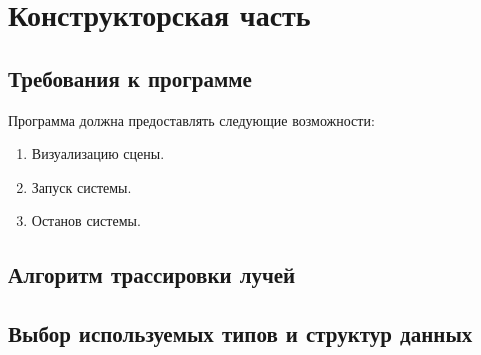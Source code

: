 \chapter{Конструкторская часть}
\label{cha:design}

 
\section{Требования к программе}

Программа должна предоставлять следующие возможности:
\begin{enumerate}
	\item Визуализацию сцены.
	\item Запуск системы.
	\item Останов системы.
\end{enumerate}	

\section{Алгоритм трассировки лучей}

\section{Выбор используемых типов и структур данных}


